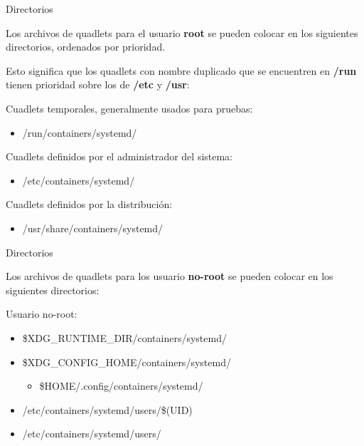 \begin{frame}[c]{Directorios}

  Los archivos de quadlets para el usuario \textbf{root} se pueden
  colocar en los siguientes directorios, ordenados por prioridad.

  \vspace{\baselineskip}
  Esto significa que los quadlets con nombre duplicado que se
  encuentren en \textbf{/run} tienen prioridad sobre los de
  \textbf{/etc} y \textbf{/usr}:
  \pausa
  \begin{alertblock}{Cuadlets temporales, generalmente usados para pruebas:}
    \begin{itemize}
      \item /run/containers/systemd/
    \end{itemize}
  \end{alertblock}
  \pausa
  \begin{exampleblock}{Cuadlets definidos por el administrador del sistema:}
    \begin{itemize}
      \item /etc/containers/systemd/
    \end{itemize}
  \end{exampleblock}
  \pausa
  \begin{block}{Cuadlets definidos por la distribución:}
    \begin{itemize}
      \item /usr/share/containers/systemd/
    \end{itemize}
  \end{block}
\end{frame}

\begin{frame}[c]{Directorios}

  Los archivos de quadlets para los usuario \textbf{no-root} se pueden
  colocar en los siguientes directorios:

  \vspace{\baselineskip}
  \begin{exampleblock}{Usuario no-root:}
    \begin{itemize}
      \item \$XDG\_RUNTIME\_DIR/containers/systemd/
      \pausa
      \item \$XDG\_CONFIG\_HOME/containers/systemd/
      \pausa
        \begin{itemize}
          \item \$HOME/.config/containers/systemd/
        \end{itemize}
      \pausa
      \item /etc/containers/systemd/users/\$(UID)
      \pausa
      \item /etc/containers/systemd/users/
    \end{itemize}
  \end{exampleblock}
\end{frame}

